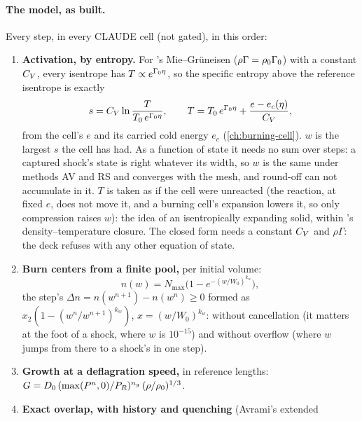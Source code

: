 \paragraph{The model, as built.} Every step, in every CLAUDE cell (not
gated), in this order:
\begin{enumerate}
\item \textbf{Activation, by entropy.} For \bw's Mie--Gr\"uneisen ($\rho\Gamma
  = \rho_0\Gamma_0$) with a constant $C_{V}$, every isentrope has $T \propto
  e^{\Gamma_0\eta}$, so the specific entropy above the reference isentrope is
  exactly
  \begin{equation}
    s = C_{V}\ln\frac{T}{T_0\,e^{\Gamma_0\eta}}, \qquad
    T = T_0\,e^{\Gamma_0\eta} + \frac{e - e_c(\eta)}{C_{V}},
    \label{eq:claude-s}
  \end{equation}
  from the cell's $e$ and its carried cold energy $e_c$
  (\cref{ch:burning-cell}). $w$ is the largest $s$ the cell has had. As a
  function of state it needs no sum over steps: a captured shock's state is
  right whatever its width, so $w$ is the same under methods AV and RS and
  converges with the mesh, and round-off can not accumulate in it. $T$ is
  taken as if the cell were unreacted (the reaction, at fixed $e$, does not
  move it, and a burning cell's expansion lowers it, so only compression
  raises $w$): the idea of an isentropically expanding solid, within
  \bw's density--temperature closure. The closed form needs a constant
  $C_{V}$ and $\rho\Gamma$: the deck refuses  with any
  other equation of state.
\item \textbf{Burn centers from a finite pool,} per initial volume:
  \begin{equation}
    n(w) = N_{\max}\bigl(1 - e^{-(w/W_0)^{k_w}}\bigr),
    \label{eq:claude-n}
  \end{equation}
  the step's $\Delta n = n(w^{n+1}) - n(w^n) \ge 0$ formed as $x_2(1 -
  (w^n/w^{n+1})^{k_w})$, $x = (w/W_0)^{k_w}$: without cancellation (it
  matters at the foot of a shock, where $w$ is $10^{-15}$) and without
  overflow (where $w$ jumps from there to a shock's in one step).
\item \textbf{Growth at a deflagration speed,} in reference lengths:
  $G = D_0\,(\max(P^n, 0)/P_R)^{n_g}\,(\rho/\rho_0)^{1/3}$.
\item \textbf{Exact overlap, with history and quenching} (Avrami's extended

\end{enumerate}
